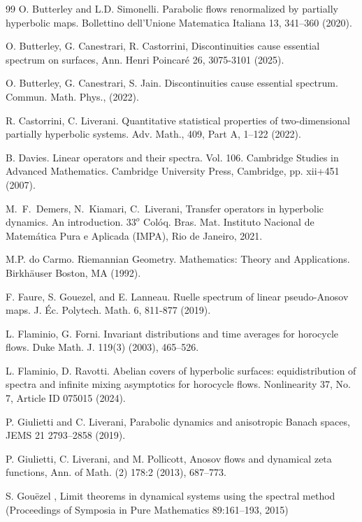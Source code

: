 \documentclass[11pt,letterpaper]{amsart}
\theoremstyle{definition}
\begin{document}
\begin{thebibliography}{99}
 O. Butterley and L.D. Simonelli. Parabolic flows renormalized by partially hyperbolic maps. Bollettino dell'Unione Matematica Italiana 13, 341--360 (2020).

 O. Butterley, G. Canestrari, R. Castorrini, Discontinuities cause essential spectrum on surfaces, Ann. Henri Poincar\'e 26, 3075-3101 (2025).

 O. Butterley, G. Canestrari, S. Jain. Discontinuities cause essential spectrum. Commun. Math. Phys., (2022).

 R. Castorrini, C. Liverani. Quantitative statistical properties of two-dimensional partially hyperbolic systems. Adv. Math., 409, Part A, 1--122 (2022).

 B. Davies.  Linear operators and their spectra. Vol. 106. Cambridge Studies in Advanced Mathematics. Cambridge University Press, Cambridge, pp. xii+451 (2007).

  M.~F.~Demers, N.~Kiamari, C.~Liverani, Transfer operators in hyperbolic dynamics. An introduction. $33^o$  Col\'oq. Bras. Mat. Instituto Nacional de Matem\'atica Pura e Aplicada (IMPA), Rio de Janeiro, 2021.

 M.P. do Carmo.  Riemannian Geometry. Mathematics: Theory and Applications. Birkh\"auser Boston, MA (1992).

 F. Faure, S. Gouezel, and E. Lanneau. Ruelle spectrum of linear pseudo-Anosov maps. J. \'{E}c. Polytech. Math. 6, 811-877 (2019).

 L. Flaminio, G. Forni. Invariant distributions and time averages for horocycle flows. Duke Math. J. 119(3) (2003), 465--526.

 L. Flaminio, D. Ravotti. Abelian covers of hyperbolic surfaces: equidistribution of spectra and infinite mixing
asymptotics for horocycle flows. Nonlinearity 37, No. 7, Article ID 075015 (2024).

 P. Giulietti and C. Liverani, Parabolic dynamics and anisotropic Banach spaces, JEMS
21 2793--2858 (2019).

 P. Giulietti, C. Liverani, and M. Pollicott, Anosov flows and dynamical zeta functions, Ann. of Math. (2) 178:2 (2013), 687--773.

 S. Gou\"ezel , Limit theorems in dynamical systems using the spectral method (Proceedings of Symposia in Pure Mathematics 89:161--193, 2015)


\end{thebibliography}
\end{document}
